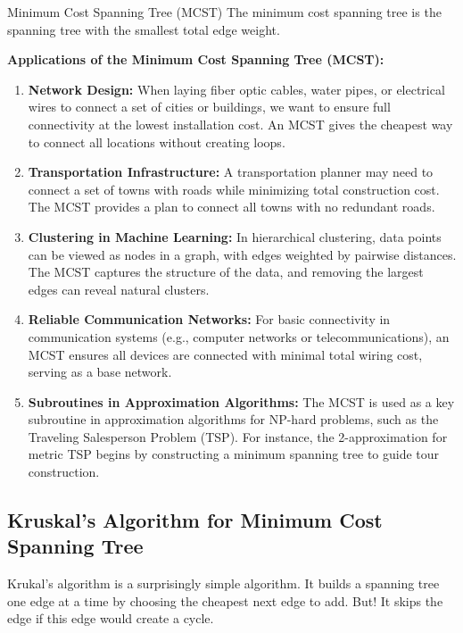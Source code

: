 \begin{definition}{Minimum Cost Spanning Tree (MCST)}{}
The minimum cost spanning tree is the spanning tree with the smallest total edge weight.  
\end{definition}

\textbf{Applications of the Minimum Cost Spanning Tree (MCST):}
\begin{enumerate}
    \item \textbf{Network Design:} When laying fiber optic cables, water pipes, or electrical wires to connect a set of cities or buildings, we want to ensure full connectivity at the lowest installation cost. An MCST gives the cheapest way to connect all locations without creating loops.

    \item \textbf{Transportation Infrastructure:} A transportation planner may need to connect a set of towns with roads while minimizing total construction cost. The MCST provides a plan to connect all towns with no redundant roads.

    \item \textbf{Clustering in Machine Learning:} In hierarchical clustering, data points can be viewed as nodes in a graph, with edges weighted by pairwise distances. The MCST captures the structure of the data, and removing the largest edges can reveal natural clusters.

    \item \textbf{Reliable Communication Networks:} For basic connectivity in communication systems (e.g., computer networks or telecommunications), an MCST ensures all devices are connected with minimal total wiring cost, serving as a base network.

    \item \textbf{Subroutines in Approximation Algorithms:} The MCST is used as a key subroutine in approximation algorithms for NP-hard problems, such as the Traveling Salesperson Problem (TSP). For instance, the 2-approximation for metric TSP begins by constructing a minimum spanning tree to guide tour construction.
\end{enumerate}


\subsection{Kruskal's Algorithm for Minimum Cost Spanning Tree}
Krukal's algorithm is a surprisingly simple algorithm.  It builds a spanning tree one edge at a time by choosing the cheapest next edge to add.  But!  It skips the edge if this edge would create a cycle.

